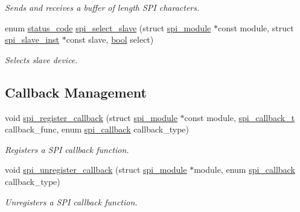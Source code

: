 \begin{DoxyCompactItemize}
\begin{DoxyCompactList}\small\item\em Sends and receives a buffer of {\ttfamily length} S\+PI characters. \end{DoxyCompactList}\item 
enum \mbox{\hyperlink{group__group__sam0__utils__status__codes_ga751c892e5a46b8e7d282085a5a5bf151}{status\+\_\+code}} \mbox{\hyperlink{group__asfdoc__sam0__sercom__spi__group_gaff6f75d83ec5251e6d1d42830b8af05f}{spi\+\_\+select\+\_\+slave}} (struct \mbox{\hyperlink{structspi__module}{spi\+\_\+module}} $\ast$const module, struct \mbox{\hyperlink{structspi__slave__inst}{spi\+\_\+slave\+\_\+inst}} $\ast$const slave, \mbox{\hyperlink{group__group__sam0__utils_ga97a80ca1602ebf2303258971a2c938e2}{bool}} select)
\begin{DoxyCompactList}\small\item\em Selects slave device. \end{DoxyCompactList}\end{DoxyCompactItemize}
\subsection*{Callback Management}
\begin{DoxyCompactItemize}
\item 
void \mbox{\hyperlink{group__asfdoc__sam0__sercom__spi__group_ga9736ace2b57a6d45d3fb820aae552a48}{spi\+\_\+register\+\_\+callback}} (struct \mbox{\hyperlink{structspi__module}{spi\+\_\+module}} $\ast$const module, \mbox{\hyperlink{group__asfdoc__sam0__sercom__spi__group_ga88d771c03a254735de0053be3fa513ca}{spi\+\_\+callback\+\_\+t}} callback\+\_\+func, enum \mbox{\hyperlink{group__asfdoc__sam0__sercom__spi__group_ga4afb8830e0197ec11f6beb8140210a88}{spi\+\_\+callback}} callback\+\_\+type)
\begin{DoxyCompactList}\small\item\em Registers a S\+PI callback function. \end{DoxyCompactList}\item 
void \mbox{\hyperlink{group__asfdoc__sam0__sercom__spi__group_ga7df7ed6a6a9d6a5e1338ceaa0d5f07b2}{spi\+\_\+unregister\+\_\+callback}} (struct \mbox{\hyperlink{structspi__module}{spi\+\_\+module}} $\ast$module, enum \mbox{\hyperlink{group__asfdoc__sam0__sercom__spi__group_ga4afb8830e0197ec11f6beb8140210a88}{spi\+\_\+callback}} callback\+\_\+type)
\begin{DoxyCompactList}\small\item\em Unregisters a S\+PI callback function. \end{DoxyCompactList}\end{DoxyCompactItemize}
